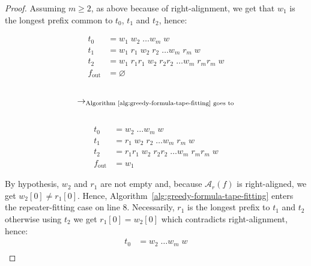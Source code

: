 \begin{proof}
    Assuming $m\geq 2$, as above because of right-alignment, we get that $w_1$ is the longest prefix common to $t_0$, $t_1$ and $t_2$, hence:
    \setlength{\columnsep}{-1.9cm}
    \begin{multicols}{3}
        \noindent
        \begin{align*}
            t_0          & = w_1\; w_2\;\dots w_m\; w                              \\
            t_1          & = w_1\; r_1\; w_2\; r_2\; \dots w_m\; r_m\; w           \\
            t_2          & = w_1\; r_1r_1\; w_2\;  r_2r_2\; \dots w_m\; r_mr_m\; w \\
            f_\text{out} & = \varnothing
        \end{align*}
        \begin{align*}
             &                                                                   \\
            \to_{\text{Algorithm~\ref{alg:greedy-formula-tape-fitting} goes to}} \\
             &
        \end{align*}
        \begin{align*}
            t_0          & = w_2\;\dots w_m\; w                              \\
            t_1          & = r_1\; w_2\; r_2\; \dots w_m\; r_m\; w           \\
            t_2          & = r_1r_1\; w_2\;  r_2r_2\; \dots w_m\; r_mr_m\; w \\
            f_\text{out} & = w_1
        \end{align*}
    \end{multicols}
    By hypothesis, $w_2$ and $r_1$ are not empty and, because $\mathcal{A}_r(f)$ is right-aligned, we get $w_2[0] \neq r_1[0]$.
    Hence, Algorithm~\ref{alg:greedy-formula-tape-fitting} enters the repeater-fitting case on line 8. Necessarily, $r_1$ is the longest prefix to $t_1$ and $t_2$ otherwise using $t_2$ we get $r_1[0] = w_2[0]$ which contradicts right-alignment, hence:
    \begin{align*}
        t_0          & = w_2\;\dots w_m\; w                     \\

\end{align*}
\end{proof}
